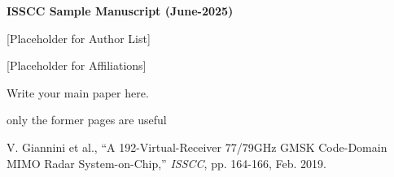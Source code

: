 \documentclass[12pt,a4paper]{article} %
\begin{document}
\textbf{ISSCC Sample Manuscript (June-2025)}

[Placeholder for Author List] 

[Placeholder for Affiliations]

Write your main paper here.

\clearpage

only the former pages are useful

\clearpage

\begin{thebibliography}{99}
\setlength{\itemsep}{0pt}

V. Giannini et al., ``A 192-Virtual-Receiver 77/79GHz GMSK Code-Domain MIMO Radar System-on-Chip,'' 
\textit{ISSCC}, pp. 164-166, Feb. 2019.

\vspace{-0.4\baselineskip} 

\end{thebibliography}
\end{document}
